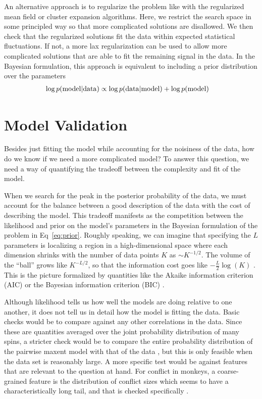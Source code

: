 \documentclass[aps,prl,twocolumn,nofootinbib]{revtex4-1}
\begin{document}
An alternative approach is to regularize the problem like with the regularized mean field or cluster expansion algorithms. Here, we restrict the search space in some principled way so that more complicated
solutions are disallowed.  We then check that the regularized solutions fit the
data within expected statistical fluctuations.  If not, a more lax regularization
can be used to allow more complicated solutions that are able to fit the
remaining signal in the data. 
In the Bayesian formulation, this approach is equivalent to including a prior distribution over the parameters
\begin{align}
	\log p({\rm model}|{\rm data}) &\propto \log p({\rm data}|{\rm model}) + \log p({\rm model})\label{eq:prior}
\end{align}

\section{Model Validation}
Besides just fitting the model while accounting for the noisiness of the data, how do we know if we need a more complicated model? To answer this question, we need a way of quantifying the tradeoff between the complexity and fit of the model. 

When we search for the peak in the posterior probability of the data, we must account for the balance between a good description of the data with the cost of describing the model. This tradeoff manifests as the competition between the likelihood and prior on the model's parameters in the Bayesian formulation of the problem in Eq~\ref{eq:prior}. Roughly speaking, we can imagine that specifying the $L$ parameters is localizing a region in a high-dimensional space where each dimension shrinks with the number of data points $K$ as $\sim K^{-1/2}$. The volume of the ``ball'' grows like $K^{-L/2}$, so that the information cost goes like $-\frac{L}{2}\log(K)$ \cite{Lee:2015ev}. This is the picture formalized by quantities like the Akaike information criterion (AIC) or the Bayesian information criterion (BIC) \cite{Anonymous:mVL3xTtr}.

Although likelihood tells us how well the models are doing relative to one another, it does not tell us in detail how the model is fitting the data.
Basic checks would be to compare against any other correlations in the data.
Since these are quantities averaged over the joint probability distribution of many spins, a stricter check would be to compare the entire probability distribution of the pairwise maxent model with that of the data \cite{Lee:2015ev}, but this is only feasible when the data set is reasonably large. 
A more specific test would be against features that are relevant to the question at hand. For conflict in monkeys, a coarse-grained feature is the distribution of conflict sizes which seems to have a characteristically long tail, and that is checked specifically \cite{Daniels:1cq}. 
\end{document}
